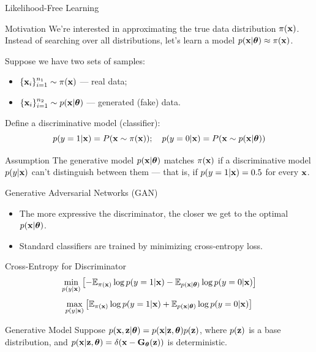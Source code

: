 \documentclass{beamer}
\begin{document}
\begin{frame}{Likelihood-Free Learning}
	\begin{block}{Motivation}
	 We're interested in approximating the true data distribution $\pi(\mathbf{x})$.
	Instead of searching over all distributions, let's learn a model $p(\mathbf{x} | \boldsymbol{\theta}) \approx \pi(\mathbf{x})$.
	\end{block}
	Suppose we have two sets of samples: 
	\begin{itemize}
		\item $\{\mathbf{x}_i\}_{i=1}^{n_1} \sim \pi(\mathbf{x})$ — real data;
		\item $\{\mathbf{x}_i\}_{i=1}^{n_2} \sim p(\mathbf{x} | \boldsymbol{\theta})$ — generated (fake) data.
	\end{itemize}
	Define a discriminative model (classifier):
	\[
		p(y = 1 | \mathbf{x}) = P(\mathbf{x} \sim \pi(\mathbf{x})); \quad p(y = 0 | \mathbf{x}) = P(\mathbf{x} \sim p(\mathbf{x} | \boldsymbol{\theta}))
	\]
	\vspace{-0.5cm}
	\begin{block}{Assumption}
		The generative model $p(\mathbf{x} | \boldsymbol{\theta})$ matches $\pi(\mathbf{x})$ if a discriminative model $p(y | \mathbf{x})$ can't distinguish between them --- that is, if $p(y = 1 | \mathbf{x}) = 0.5$ for every $\mathbf{x}$.
	\end{block}
\end{frame}
\begin{frame}{Generative Adversarial Networks (GAN)}
	\begin{itemize}
		\item The more expressive the discriminator, the closer we get to the optimal $p(\mathbf{x} | \boldsymbol{\theta})$.
		\item Standard classifiers are trained by minimizing cross-entropy loss.
	\end{itemize}
	\begin{block}{Cross-Entropy for Discriminator}
		\vspace{-0.3cm}
		\[
			\min_{p(y | \mathbf{x})} \left[ - \mathbb{E}_{\pi(\mathbf{x})} \log p(y = 1 | \mathbf{x}) - \mathbb{E}_{p(\mathbf{x} | \boldsymbol{\theta})} \log p(y = 0 | \mathbf{x}) \right] 
		\]
		\[
			\max_{p(y | \mathbf{x})} \left[\mathbb{E}_{\pi(\mathbf{x})} \log p(y = 1 | \mathbf{x}) + \mathbb{E}_{p(\mathbf{x} | \boldsymbol{\theta})} \log p(y = 0 | \mathbf{x}) \right] 
		\]
	\end{block}
	\vspace{-0.3cm}
	\begin{block}{Generative Model}
		Suppose $p(\mathbf{x}, \mathbf{z} | \boldsymbol{\theta}) = p (\mathbf{x} | \mathbf{z}, \boldsymbol{\theta}) p(\mathbf{z})$, where $p(\mathbf{z})$ is a base distribution, and $p(\mathbf{x} | \mathbf{z}, \boldsymbol{\theta}) = \delta (\mathbf{x} - \mathbf{G}_{\boldsymbol{\theta}}(\mathbf{z}))$ is deterministic.
	\end{block}
\end{frame}
\end{document}

